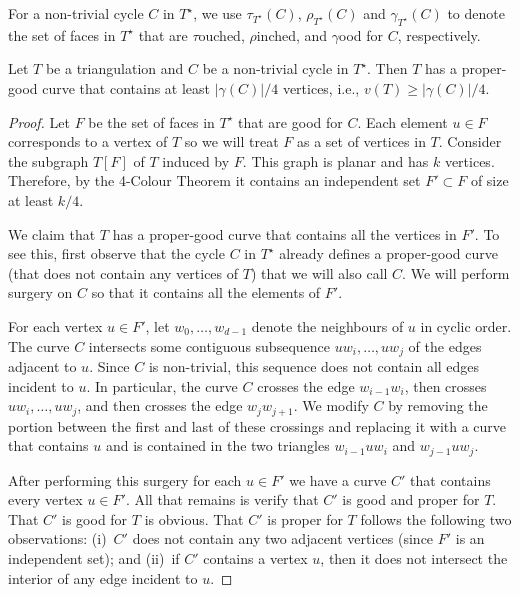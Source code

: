 \documentclass{patmorin}
\newcommand{\dual}[1]{{#1}^\star}
\begin{document}
For a non-trivial cycle $C$ in $\dual{T}$, we use $\tau_{\dual{T}}(C)$,
$\rho_{\dual{T}}(C)$ and $\gamma_{\dual{T}}(C)$ to denote the set of
faces in $\dual{T}$ that are $\tau$ouched, $\rho$inched, and $\gamma$ood
for $C$, respectively.

\begin{lem}
   Let $T$ be a triangulation and $C$ be a non-trivial cycle in
   $\dual{T}$.  Then $T$ has a proper-good curve that contains at least
   $|\gamma(C)|/4$ vertices, i.e., $v(T)\ge |\gamma(C)|/4$.
\end{lem}

\begin{proof}
  Let $F$ be the set of faces in $\dual{T}$ that are good for $C$. Each
  element $u\in F$ corresponds to a vertex of $T$ so we will treat $F$
  as a set of vertices in $T$.  Consider the subgraph $T[F]$ of $T$
  induced by $F$.  This graph is planar and has $k$ vertices. Therefore,
  by the 4-Colour Theorem it contains an independent set $F'\subset F$
  of size at least $k/4$.

  We claim that $T$ has a proper-good curve that contains all the vertices
  in $F'$.  To see this, first observe that the cycle $C$ in $\dual{T}$
  already defines a proper-good curve (that does not contain any vertices
  of $T$) that we will also call $C$.  We will perform surgery on $C$
  so that it contains all the elements of $F'$.

  For each vertex $u\in F'$, let $w_0,\ldots,w_{d-1}$ denote the
  neighbours of $u$ in cyclic order.  The curve $C$ intersects some
  contiguous subsequence $uw_i,\ldots,uw_j$ of the edges adjacent
  to $u$.  Since $C$ is non-trivial, this sequence does not contain all
  edges incident to $u$. In particular, the curve $C$ crosses the edge
  $w_{i-1}w_i$, then crosses
  $uw_i,\ldots,uw_j$, and then crosses the edge $w_j w_{j+1}$.  We modify
  $C$ by removing the portion between the first and last of these crossings
  and replacing it with a curve that contains $u$ and is contained in the
  two triangles $w_{i-1}uw_i$ and $w_{j-1}uw_j$.

  After performing this surgery for each $u\in F'$ we have a curve $C'$
  that contains every vertex $u\in F'$.  All that remains is verify that
  $C'$ is good and proper for $T$. That $C'$ is good for $T$ is
  obvious.  That $C'$ is proper for $T$ follows the following two observations:
  (i)~$C'$ does not contain any two adjacent vertices (since $F'$ is an
  independent set); and (ii)~if $C'$ contains a vertex $u$, then it does
  not intersect the interior of any edge incident to $u$.
\end{proof}
\end{document}
